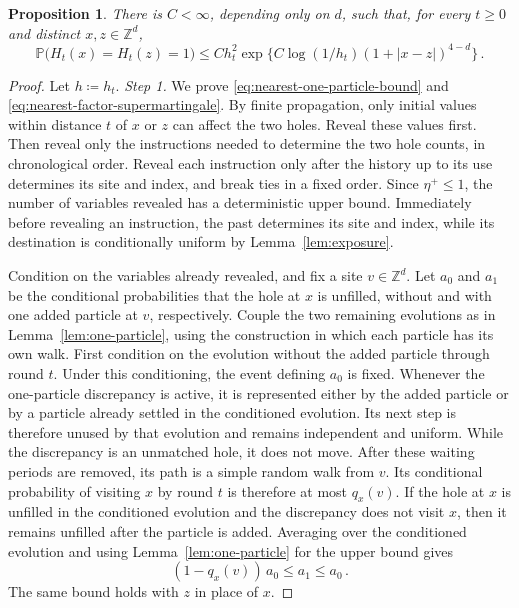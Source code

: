 \documentclass[11pt]{amsart}
\theoremstyle{plain}
\newtheorem{proposition}[theorem]{Proposition}
\theoremstyle{definition}
\newcommand{\Z}{\mathbb{Z}}
\renewcommand{\P}{\mathbb{P}}
\begin{document}
\begin{proposition}\label{prop:nearest-two-hole}
	There is $C<\infty$, depending only on $d$, such that, for every $t\geq0$ and
	distinct $x,z\in\Z^d$,
	\begin{equation}\label{eq:nearest-two-hole}
		\P\bigl(H_t(x)=H_t(z)=1\bigr)
		\leq Ch_t^2\exp\bigl\{C\log(1/h_t)(1+|x-z|)^{4-d}\bigr\}\,.
	\end{equation}
\end{proposition}

\begin{proof}
	Let $h\coloneqq h_t$.
	\smallskip
	\noindent\emph{Step 1.} We prove \eqref{eq:nearest-one-particle-bound} and
	\eqref{eq:nearest-factor-supermartingale}.
	By finite propagation, only initial values within distance $t$ of $x$ or
	$z$ can affect the two holes. Reveal these values first. Then reveal only the
	instructions needed to determine the two hole counts, in chronological order.
	Reveal each instruction only after the history up to its use determines its
	site and index, and break ties in a fixed order. Since $\eta^+\leq1$, the number of variables
	revealed has a deterministic upper bound. Immediately before revealing an
	instruction, the past determines its site and index, while its destination is
	conditionally uniform by Lemma~\ref{lem:exposure}.

	Condition on the variables already revealed, and fix a site $v\in\Z^d$. Let
	$a_0$ and $a_1$ be the conditional probabilities that the hole at $x$ is
	unfilled, without and with one added particle at $v$, respectively.
	Couple the two remaining evolutions as in
	Lemma~\ref{lem:one-particle}, using the construction in which each particle has
	its own walk. First condition on the evolution without the added particle
	through round $t$. Under this conditioning, the event defining $a_0$ is fixed.
	Whenever the one-particle discrepancy is active, it is represented either by
	the added particle or by a particle already settled in the conditioned
	evolution. Its next step is therefore unused by that evolution and remains
	independent and uniform. While the discrepancy is an unmatched hole, it does not move. After these waiting periods are removed, its path is a simple random
	walk from $v$. Its conditional probability of visiting $x$ by round $t$ is therefore at most $q_x(v)$. If the hole at $x$ is unfilled in the conditioned
	evolution and the discrepancy does not visit $x$, then it remains unfilled after the particle is added. Averaging over the conditioned evolution and using Lemma~\ref{lem:one-particle} for the upper bound gives
	\begin{equation}\label{eq:nearest-one-particle-bound}
		(1-q_x(v))\,a_0\leq a_1\leq a_0\,.
	\end{equation}
	The same bound holds with $z$ in place of $x$.


\end{proof}
\end{document}
